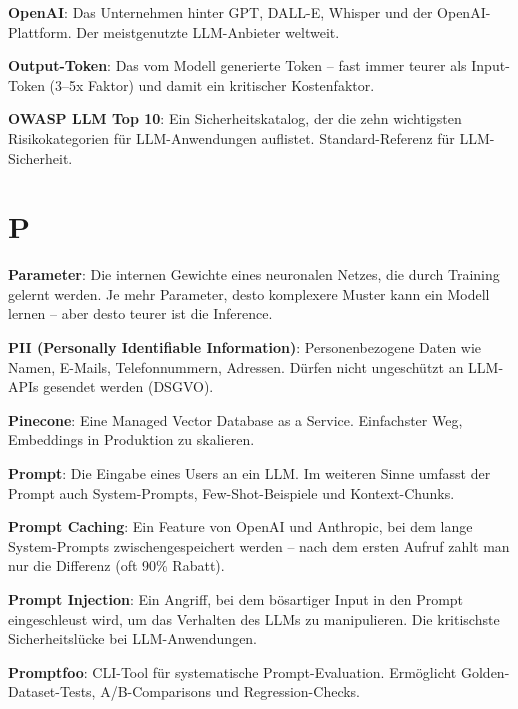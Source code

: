 \textbf{OpenAI}\hspace{0pt}: Das Unternehmen hinter GPT, DALL-E, Whisper und der OpenAI-Plattform. Der meistgenutzte LLM-Anbieter weltweit.

\textbf{Output-Token}\hspace{0pt}: Das vom Modell generierte Token -- fast immer teurer als Input-Token (3--5x Faktor) und damit ein kritischer Kostenfaktor.

\textbf{OWASP LLM Top 10}\hspace{0pt}: Ein Sicherheitskatalog, der die zehn wichtigsten Risikokategorien für LLM-Anwendungen auflistet. Standard-Referenz für LLM-Sicherheit.

\section{P}

\textbf{Parameter}\hspace{0pt}: Die internen Gewichte eines neuronalen Netzes, die durch Training gelernt werden. Je mehr Parameter, desto komplexere Muster kann ein Modell lernen -- aber desto teurer ist die Inference.

\textbf{PII (Personally Identifiable Information)}\hspace{0pt}: Personenbezogene Daten wie Namen, E-Mails, Telefonnummern, Adressen. Dürfen nicht ungeschützt an LLM-APIs gesendet werden (DSGVO).

\textbf{Pinecone}\hspace{0pt}: Eine Managed Vector Database as a Service. Einfachster Weg, Embeddings in Produktion zu skalieren.

\textbf{Prompt}\hspace{0pt}: Die Eingabe eines Users an ein LLM. Im weiteren Sinne umfasst der Prompt auch System-Prompts, Few-Shot-Beispiele und Kontext-Chunks.

\textbf{Prompt Caching}\hspace{0pt}: Ein Feature von OpenAI und Anthropic, bei dem lange System-Prompts zwischengespeichert werden -- nach dem ersten Aufruf zahlt man nur die Differenz (oft 90\% Rabatt).

\textbf{Prompt Injection}\hspace{0pt}: Ein Angriff, bei dem bösartiger Input in den Prompt eingeschleust wird, um das Verhalten des LLMs zu manipulieren. Die kritischste Sicherheitslücke bei LLM-Anwendungen.

\textbf{Promptfoo}\hspace{0pt}: CLI-Tool für systematische Prompt-Evaluation. Ermöglicht Golden-Dataset-Tests, A/B-Comparisons und Regression-Checks.

